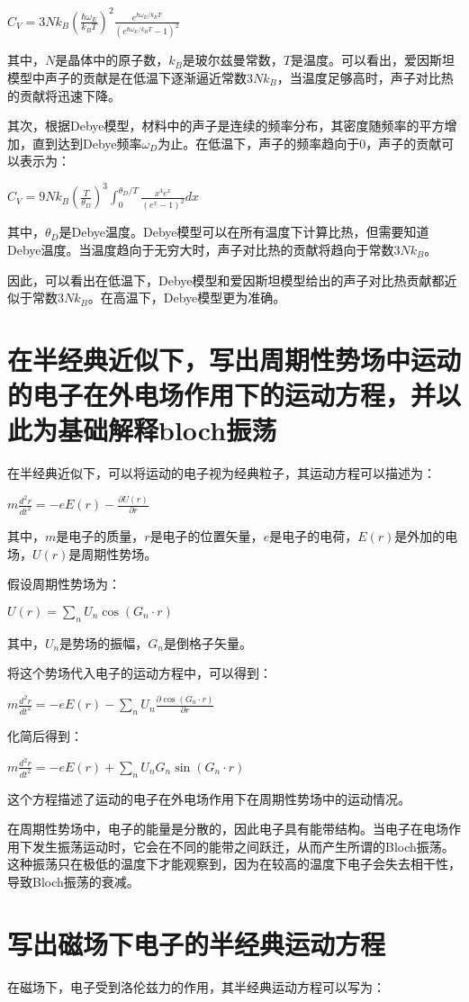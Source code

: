 \documentclass[12pt, a4paper, oneside]{ctexart}
\begin{document}
\begin{spacing}{2.0}
$C_V = 3Nk_B \left( \frac{\hbar \omega_E}{k_B T} \right)^2 \frac{e^{\hbar \omega_E / k_B T}}{(e^{\hbar \omega_E / k_B T} - 1)^2}$

其中，$N$是晶体中的原子数，$k_B$是玻尔兹曼常数，$T$是温度。可以看出，爱因斯坦模型中声子的贡献是在低温下逐渐逼近常数$3Nk_B$，当温度足够高时，声子对比热的贡献将迅速下降。

其次，根据Debye模型，材料中的声子是连续的频率分布，其密度随频率的平方增加，直到达到Debye频率$\omega_D$为止。在低温下，声子的频率趋向于0，声子的贡献可以表示为：

$C_V = 9Nk_B \left( \frac{T}{\theta_D} \right)^3 \int_0^{\theta_D/T} \frac{x^4 e^x}{(e^x-1)^2} dx$

其中，$\theta_D$是Debye温度。Debye模型可以在所有温度下计算比热，但需要知道Debye温度。当温度趋向于无穷大时，声子对比热的贡献将趋向于常数$3Nk_B$。

因此，可以看出在低温下，Debye模型和爱因斯坦模型给出的声子对比热贡献都近似于常数$3Nk_B$。在高温下，Debye模型更为准确。
\section{在半经典近似下，写出周期性势场中运动的电子在外电场作用下的运动方程，并以此为基础解释bloch振荡}
在半经典近似下，可以将运动的电子视为经典粒子，其运动方程可以描述为：

$m\frac{d^2r}{dt^2}=-eE(r)-\frac{\partial U(r)}{\partial r}$

其中，$m$是电子的质量，$r$是电子的位置矢量，$e$是电子的电荷，$E(r)$是外加的电场，$U(r)$是周期性势场。

假设周期性势场为：

$U(r)=\sum_{n}U_n\cos(G_n\cdot r)$

其中，$U_n$是势场的振幅，$G_n$是倒格子矢量。

将这个势场代入电子的运动方程中，可以得到：

$m\frac{d^2r}{dt^2}=-eE(r)-\sum_{n}U_n\frac{\partial \cos(G_n\cdot r)}{\partial r}$

化简后得到：

$m\frac{d^2r}{dt^2}=-eE(r)+\sum_{n}U_n G_n \sin(G_n\cdot r)$

这个方程描述了运动的电子在外电场作用下在周期性势场中的运动情况。

在周期性势场中，电子的能量是分散的，因此电子具有能带结构。当电子在电场作用下发生振荡运动时，它会在不同的能带之间跃迁，从而产生所谓的Bloch振荡。
这种振荡只在极低的温度下才能观察到，因为在较高的温度下电子会失去相干性，导致Bloch振荡的衰减。
\section{写出磁场下电子的半经典运动方程}
在磁场下，电子受到洛伦兹力的作用，其半经典运动方程可以写为：


\end{spacing}
\end{document}
